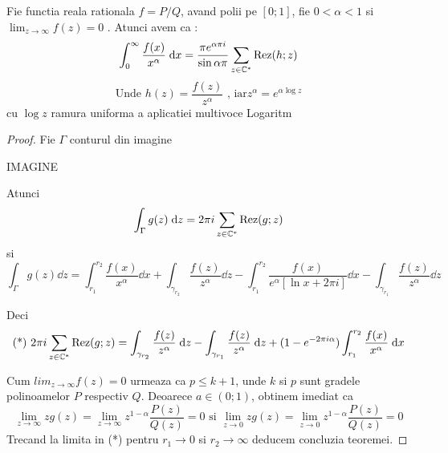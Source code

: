    \begin{theorem}
        Fie functia reala rationala $f=P / Q$, avand polii pe $[0;1]$, fie $0<\alpha<1$ si
        $\displaystyle \lim_{z\to \infty} f(z) = 0$ .
        Atunci avem ca :
        \[
            \int_{0}^{\infty} \frac{f(x)}{x^\alpha} \; \mathrm{d} x
                = \frac{\pi e^{\alpha \pi i}}{\sin \alpha \pi} \sum_{z\in \mathbb{C}^*} \operatorname{Rez}(h;z)
        \]
        \[
            \text{Unde } h(z) = \frac{f(z)}{z^\alpha} \text{ , iar} z^\alpha = e^{\alpha \log z}
        \]
        cu $\log z$ ramura uniforma a aplicatiei multivoce Logaritm
        \begin{proof}           
            Fie $\Gamma $ conturul din imagine

            IMAGINE

            Atunci
            \[
                \int_{\Gamma} g(z) \; \mathrm{d} z = 2\pi i \sum_{z\in \mathbb{C}^*} \operatorname{Rez}(g;z)
            \]
            si
            \[
              \int_{\Gamma} g(z) \dd z
                    = \int_{r_1}^{r_2} \frac{f(x)}{x^\alpha} \dd x
                    + \int_{\gamma_{r_2} } \frac{f(z)}{z^\alpha} \dd z
                    - \int_{r_1}^{r_2} \frac{f(x)}{e^\alpha[\ln x + 2\pi i]} \dd x
                    - \int_{\gamma_{r_1}} \frac{f(z)}{z^\alpha} \dd z
            \]
            
            Deci
            \[
               \text{(*) } 2 \pi i  \sum_{z\in \mathbb{C}^*} \operatorname{Rez}(g;z)
                    = \int_{\gamma_{r_2}} \frac{f(z)}{z^\alpha} \; \mathrm{d} z
                    - \int_{\gamma_{r_1}} \frac{f(z)}{z^\alpha} \; \mathrm{d} z
                    + (1-e^{-2\pi i \alpha}) \int_{r_1}^{r_2} \frac{f(x)}{x^\alpha} \; \mathrm{d} x
            \]
            
            Cum $\displaystyle lim_{z\to\infty} f(z) = 0$ urmeaza ca $p \leq k+1$, unde $k$ si $p$
            sunt gradele polinoamelor $P$ respectiv $Q$. Deoarece $a \in (0;1)$, obtinem imediat
            ca
            \[
                \lim_{z\to\infty} z g(z) = \lim_{z\to\infty} z^{1-\alpha} \frac{P(z)}{Q(z)} = 0
                \text{ si }
                \lim_{z\to 0} z g(z) = \lim_{z\to 0} z^{1-\alpha} \frac{P(z)}{Q(z)} = 0
            \]
            Trecand la limita in (*) pentru $r_1 \to 0$ si $r_2 \to \infty$ deducem concluzia teoremei.
        \end{proof}
    \end{theorem}

